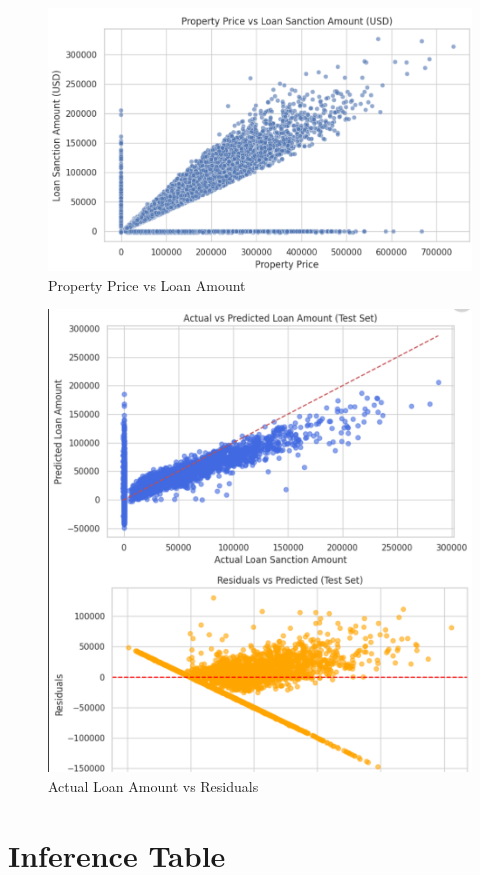 \documentclass{article}
\begin{document}
\begin{figure}[H]
    \centering
    \includegraphics[width=0.8\linewidth]{pt_lmt.png}
    \caption{Property Price vs Loan Amount}
    \label{fig:pt_lmt}
\end{figure}

\begin{figure}[H]
    \centering
    \includegraphics[width=0.8\linewidth]{actual_residual.png}
    \caption{Actual Loan Amount vs Residuals}
    \label{fig:actual_residual}
\end{figure}


\section{Inference Table}
\end{document}
